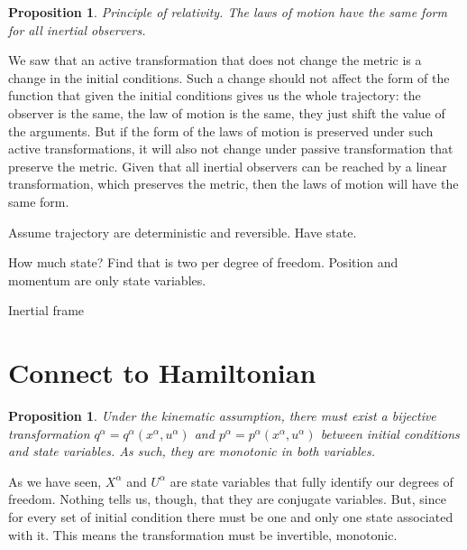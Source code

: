\documentclass[aps,pra,10pt,twocolumn,floatfix,nofootinbib]{revtex4-1}
\newtheorem{prop}[thm]{Proposition}
\theoremstyle{definition}
\begin{document}
\begin{prop}
Principle of relativity. The laws of motion have the same form for all inertial observers.
\end{prop}

We saw that an active transformation that does not change the metric is a change in the initial conditions. Such a change should not affect the form of the function that given the initial conditions gives us the whole trajectory: the observer is the same, the law of motion is the same, they just shift the value of the arguments. But if the form of the laws of motion is preserved under such active transformations, it will also not change under passive transformation that preserve the metric. Given that all inertial observers can be reached by a linear transformation, which preserves the metric, then the laws of motion will have the same form.







Assume trajectory are deterministic and reversible. Have state.

How much state? Find that is two per degree of freedom. Position and momentum are only state variables.

Inertial frame

\section{Connect to Hamiltonian}
\begin{prop}\label{continuousLabels}
Under the kinematic assumption, there must exist a bijective transformation $q^\alpha=q^\alpha(x^\alpha,u^\alpha)$ and $p^\alpha=p^\alpha(x^\alpha,u^\alpha)$ between initial conditions and state variables. As such, they are monotonic in both variables.
\end{prop}

As we have seen, $X^\alpha$ and $U^\alpha$ are state variables that fully identify our degrees of freedom. Nothing tells us, though, that
they are conjugate variables. But, since for every set of initial condition there must be one and only one state associated with it. This means the transformation must be invertible, monotonic.
\end{document}

